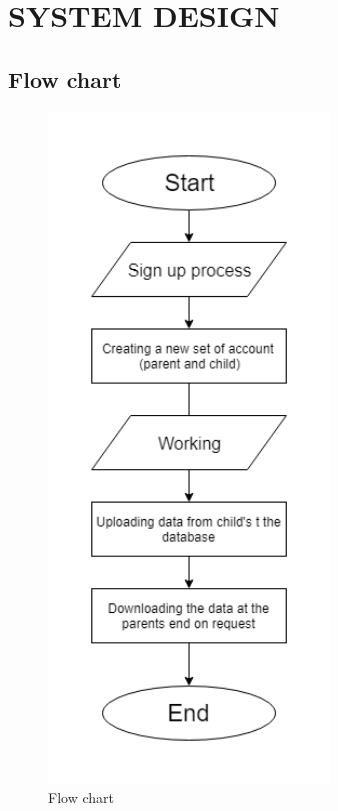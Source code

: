 \chapter{SYSTEM DESIGN}
\section{Flow chart}
\begin{figure}[!h]
	\centering
	\includegraphics[height=7in]{flowchart.PNG}
	\caption{Flow chart}
\end{figure}

